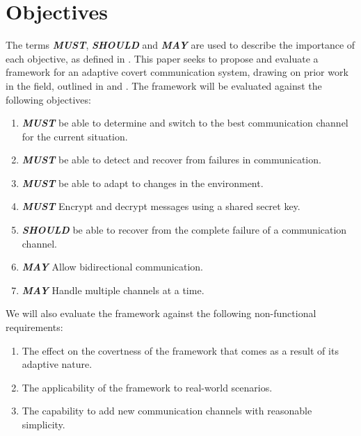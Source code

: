\chapter{Objectives}
\label{ch:objectives}

The terms \textit{\textbf{MUST}}, \textit{\textbf{SHOULD}} and \textit{\textbf{MAY}} are used to describe the importance of each objective, as defined in \cite{rfc2119}.
This paper seeks to propose and evaluate a framework for an adaptive covert communication system, drawing on prior work in the field, outlined in  and . The framework will be evaluated against the following objectives:

\begin{enumerate}
    \item \textit{\textbf{MUST}} be able to determine and switch to the best communication channel for the current situation.
    \item \textit{\textbf{MUST}} be able to detect and recover from failures in communication.
    \item \textit{\textbf{MUST}} be able to adapt to changes in the environment. 
    \item \textit{\textbf{MUST}} Encrypt and decrypt messages using a shared secret key.
    \item \textit{\textbf{SHOULD}} be able to recover from the complete failure of a communication channel.
    \item \textit{\textbf{MAY}} Allow bidirectional communication.
    \item \textit{\textbf{MAY}} Handle multiple channels at a time.
\end{enumerate}

We will also evaluate the framework against the following non-functional requirements:

\begin{enumerate}
    \item The effect on the covertness of the framework that comes as a result of its adaptive nature.
    \item The applicability of the framework to real-world scenarios.
    \item The capability to add new communication channels with reasonable simplicity.
\end{enumerate}

